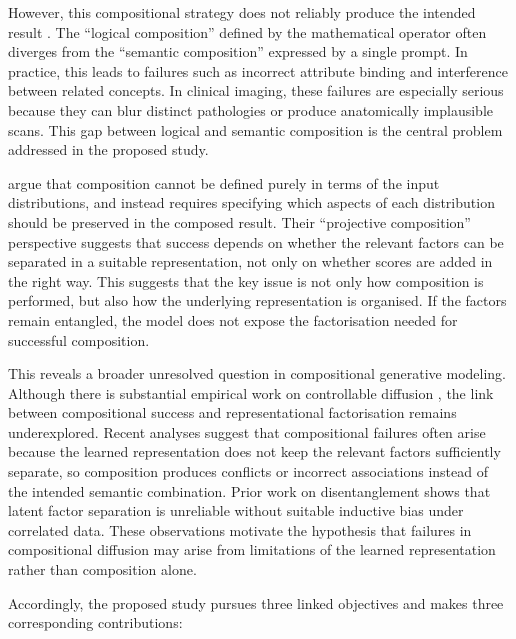 However, this compositional strategy does not reliably produce the intended result \citep{t2i_compbench_2025,mechanisms2025projective,du2024compositional}. 
The ``logical composition'' defined by the mathematical operator often diverges from the ``semantic composition'' expressed by a single prompt. 
In practice, this leads to failures such as incorrect attribute binding and interference between related concepts. 
In clinical imaging, these failures are especially serious because they can blur distinct pathologies or produce anatomically implausible scans. 
This gap between logical and semantic composition is the central problem addressed in the proposed study.

\citet{mechanisms2025projective} argue that composition cannot be defined purely in terms of the input distributions, and instead requires specifying which aspects of each distribution should be preserved in the composed result. 
Their ``projective composition'' perspective suggests
that success depends on whether the relevant factors can be separated in a suitable
representation, not only on whether scores are added in the right way. 
This suggests that the key issue is not only how composition is performed, but also how the underlying representation is organised. 
If the factors remain entangled, the model does not expose the factorisation needed for successful composition.

This reveals a broader unresolved question in compositional generative modeling. 
Although there is substantial empirical work on controllable diffusion \citep{wu2024ifadapter, xing2024csgo}, the link between compositional success and representational factorisation remains underexplored. 
Recent analyses \citep{mechanisms2025projective, du2024compositional, t2i_compbench_2025} suggest that compositional failures often arise because the learned representation does not keep the relevant factors sufficiently separate, so composition produces conflicts or incorrect associations instead of the intended semantic combination.
Prior work on disentanglement \citep{challeau2019challenging, traeuble2021disentangled} shows that latent factor separation is unreliable without suitable inductive bias under correlated data. 
These observations motivate the hypothesis that failures in compositional diffusion may arise from limitations of the learned representation rather than composition alone.

Accordingly, the proposed study pursues three linked objectives and makes three corresponding contributions:


